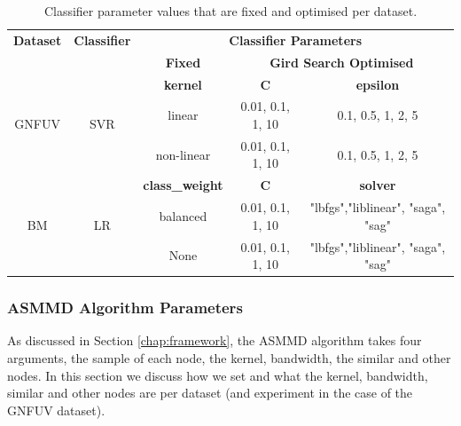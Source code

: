 \documentclass{mpaper}
\begin{document}
\begin{table}[]
\centering
\begin{tabular}{|c|c|ccc|}
\hline
\textbf{Dataset}       & \textbf{Classifier}  & \multicolumn{3}{c|}{\textbf{Classifier Parameters}}                                                 \\ \cline{3-5} 
                       &                      & \multicolumn{1}{c|}{\textbf{Fixed}}         & \multicolumn{2}{c|}{\textbf{Gird Search Optimised}}   \\ \hline
\multirow{3}{*}{GNFUV} & \multirow{3}{*}{SVR} & \multicolumn{1}{c|}{\textbf{kernel}}        & \textbf{C}       & \textbf{epsilon}                   \\ \cline{3-5} 
                       &                      & \multicolumn{1}{c|}{linear}                 & 0.01, 0.1, 1, 10 & 0.1, 0.5, 1, 2, 5                  \\
                       &                      & \multicolumn{1}{c|}{non-linear}             & 0.01, 0.1, 1, 10 & 0.1, 0.5, 1, 2, 5                  \\ \hline
\multirow{3}{*}{BM}    & \multirow{3}{*}{LR}  & \multicolumn{1}{c|}{\textbf{class\_weight}} & \textbf{C}       & \textbf{solver}                    \\ \cline{3-5} 
                       &                      & \multicolumn{1}{c|}{balanced}               & 0.01, 0.1, 1, 10 & "lbfgs","liblinear", "saga", "sag" \\
                       &                      & \multicolumn{1}{c|}{None}                   & 0.01, 0.1, 1, 10 & "lbfgs","liblinear", "saga", "sag" \\ \hline
\end{tabular}
\caption{\label{tab:classifier_parameters} Classifier parameter values that are fixed and optimised per dataset.}
\end{table}


\subsubsection{ASMMD Algorithm Parameters}\label{chap:asmmd_parameters}

As discussed in Section \ref{chap:framework}, the ASMMD algorithm  takes four arguments, the sample of each node, the kernel, bandwidth, the similar and other nodes. In this section we discuss how we set and what the kernel, bandwidth, similar and other nodes are per dataset (and experiment in the case of the GNFUV dataset). 
\end{document}
